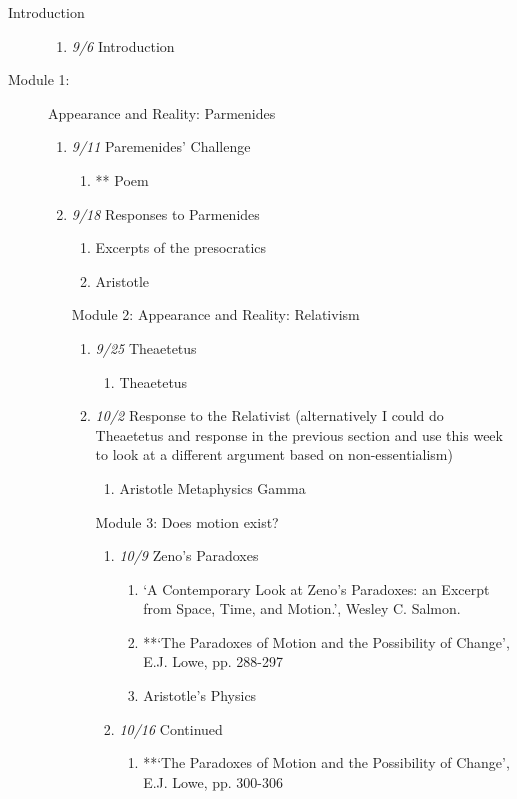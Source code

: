 \documentclass[article,oneside]{memoir}
\begin{document}
\begin{description}
\item[Introduction] 
\begin{enumerate}
\item \textit{9/6} Introduction
\end{enumerate}


\item[Module 1:] Appearance and Reality: Parmenides 
\begin{enumerate}
\item \textit{9/11} Paremenides' Challenge
\begin{enumerate}
\item ** Poem
\end{enumerate}

\item \textit{9/18} Responses to Parmenides
\begin{enumerate}
\item Excerpts of the presocratics
\item Aristotle
\end{enumerate}

\item[Module 2:] Appearance and Reality: Relativism
\begin{enumerate}
\item \textit{9/25} Theaetetus
\begin{enumerate}
\item Theaetetus
\end{enumerate}

\item \textit{10/2} Response to the Relativist (alternatively I could do Theaetetus and response in the previous section and use this week to look at a different argument based on non-essentialism)
\begin{enumerate}
\item Aristotle Metaphysics Gamma
\end{enumerate}


\item[Module 3:] Does motion exist? 
\begin{enumerate}
\item \textit{10/9} Zeno's Paradoxes
\begin{enumerate}
\item `A Contemporary Look at Zeno’s Paradoxes: an Excerpt from Space, Time, and Motion.', Wesley C. Salmon. 
\item **`The Paradoxes of Motion and the Possibility of Change', E.J. Lowe, pp. 288-297
\item Aristotle's Physics
\end{enumerate}
\item \textit{10/16} Continued
\begin{enumerate}
\item **`The Paradoxes of Motion and the Possibility of Change', E.J. Lowe, pp. 300-306
\end{enumerate}
\end{enumerate}


\end{enumerate}
\end{enumerate}
\end{description}
\end{document}
